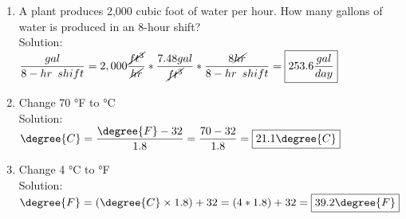 \begin{enumerate}
\vspace{0.2cm}
\item A plant produces 2,000 cubic foot of water per hour. How many gallons of water is produced in an 8-hour shift?\\
Solution:\\
\vspace{0.2cm}
$\dfrac{gal}{8-hr \enspace shift}=2,000\dfrac{\cancel{ft^3}}{\cancel{hr}}*\dfrac{7.48gal}{\cancel{ft^3}}*\dfrac{8\cancel{hr}}{8-hr \enspace shift}=\boxed{253.6 \dfrac{gal}{day}}$
\vspace{0.2cm}

\item Change 70 °F to °C\\
Solution:\\
\vspace{0.2cm}
$\degree{C} = \dfrac{\degree{F}-32}{1.8} = \dfrac{70-32}{1.8}=\boxed{21.1\degree{C}}$
\vspace{0.2cm}

\item Change 4 °C to °F\\
Solution:\\
\vspace{0.2cm}
$\degree{F}=(\degree{C} \times 1.8)+32 = (4*1.8)+32=\boxed{39.2\degree{F}}$
\vspace{0.2cm}
\end{enumerate}


